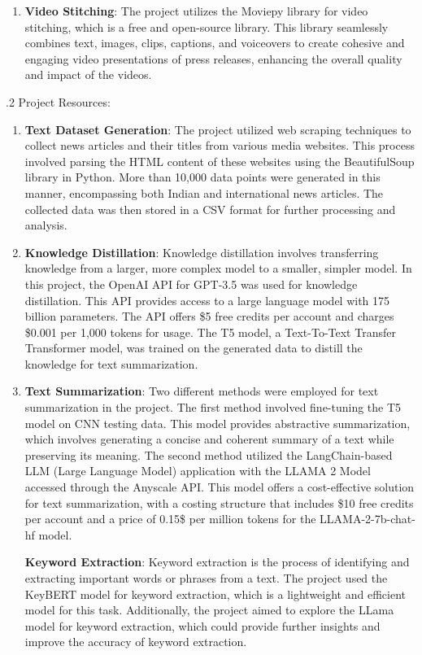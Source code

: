 \documentclass[12pt]{article}
\begin{document}
\begin{enumerate}
\item \textbf{Video Stitching}: The project utilizes the Moviepy library for video stitching, which is a free and open-source library. This library seamlessly combines text, images, clips, captions, and voiceovers to create cohesive and engaging video presentations of press releases, enhancing the overall quality and impact of the videos.
\end{enumerate}

.2 Project Resources:

\begin{enumerate}

\item \textbf{Text Dataset Generation}: The project utilized web scraping techniques to collect news articles and their titles from various media websites. This process involved parsing the HTML content of these websites using the BeautifulSoup library in Python. More than 10,000 data points were generated in this manner, encompassing both Indian and international news articles. The collected data was then stored in a CSV format for further processing and analysis.

\item \textbf{Knowledge Distillation}: Knowledge distillation involves transferring knowledge from a larger, more complex model to a smaller, simpler model. In this project, the OpenAI API for GPT-3.5 was used for knowledge distillation. This API provides access to a large language model with 175 billion parameters. The API offers \$5 free credits per account and charges \$0.001 per 1,000 tokens for usage. The T5 model, a Text-To-Text Transfer Transformer model, was trained on the generated data to distill the knowledge for text summarization.

\item \textbf{Text Summarization}: Two different methods were employed for text summarization in the project. The first method involved fine-tuning the T5 model on CNN testing data. This model provides abstractive summarization, which involves generating a concise and coherent summary of a text while preserving its meaning. The second method utilized the LangChain-based LLM (Large Language Model) application with the LLAMA 2 Model accessed through the Anyscale API. This model offers a cost-effective solution for text summarization, with a costing structure that includes \$10 free credits per account and a price of 0.15\$ per million tokens for the LLAMA-2-7b-chat-hf model.

\textbf{Keyword Extraction}: Keyword extraction is the process of identifying and extracting important words or phrases from a text. The project used the KeyBERT model for keyword extraction, which is a lightweight and efficient model for this task. Additionally, the project aimed to explore the LLama model for keyword extraction, which could provide further insights and improve the accuracy of keyword extraction.


\end{enumerate}
\end{document}
